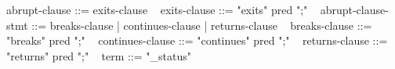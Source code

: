 \begin{syntax}
    { abrupt-clause } ::= { exits-clause }
    \
    { exits-clause } ::= { "exits" pred ";" }
    \
    { abrupt-clause-stmt } ::= { breaks-clause } | { continues-clause } | { returns-clause }
    \
    { breaks-clause } ::= { "breaks" pred ";" }
    \
    { continues-clause } ::= { "continues" pred ";" }
    \
    { returns-clause } ::= { "returns" pred ";" }
    \
    { term } ::= { "\exit_status" }
  \end{syntax}
